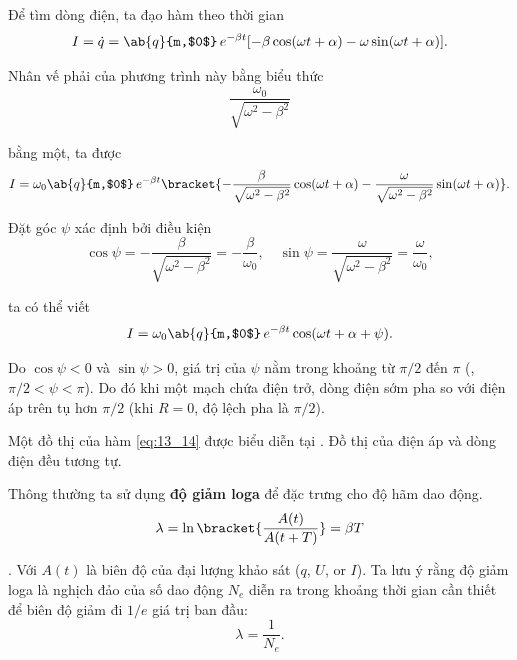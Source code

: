 Để tìm dòng điện, ta đạo hàm  theo thời gian
\begin{equation*}
    I = \dot{q} = \ab{q}{m,$0$}\, e^{-\beta t} [-\beta \cos(\omega t + \alpha) - \omega \sin(\omega t + \alpha)].
\end{equation*}

\noindent
Nhân vế phải của phương trình này bằng biểu thức
\begin{equation*}
    \frac{\omega_0}{\sqrt{\omega^2-\beta^2}}
\end{equation*}

\noindent
bằng một, ta được
\begin{equation*}
    I = \omega_0 \ab{q}{m,$0$}\, e^{-\beta t} \bracket{ - \frac{\beta}{\sqrt{\omega^2-\beta^2}} \cos(\omega t + \alpha) - \frac{\omega}{\sqrt{\omega^2-\beta^2}} \sin(\omega t + \alpha) }.
\end{equation*}

Đặt góc $\psi$ xác định bởi điều kiện
\begin{equation*}
    \cos\psi = - \frac{\beta}{\sqrt{\omega^2-\beta^2}} = - \frac{\beta}{\omega_0},\quad \sin\psi = \frac{\omega}{\sqrt{\omega^2-\beta^2}} = \frac{\omega}{\omega_0},
\end{equation*}

\noindent
ta có thể viết
\begin{equation}\label{eq:13_17}
    I = \omega_0 \ab{q}{m,$0$}\, e^{-\beta t} \cos(\omega t + \alpha + \psi).
\end{equation}

\noindent
Do $\cos\psi<0$ và $\sin\psi>0$, giá trị của $\psi$ nằm trong khoảng từ $\pi/2$ đến $\pi$ (\ie, $\pi/2<\psi<\pi$).
Do đó khi một mạch chứa điện trở, dòng điện sớm pha so với điện áp trên tụ hơn $\pi/2$ (khi $R=0$, độ lệch pha là $\pi/2$).

Một đồ thị của hàm \eqref{eq:13_14} được biểu diễn tại .
Đồ thị của điện áp và dòng điện đều tương tự.

Thông thường ta sử dụng \textbf{độ giảm loga} để đặc trưng cho độ hãm dao động.
\begin{equation}\label{eq:13_18}
    \lambda = \ln\bracket{ \frac{A(t)}{A(t+T)} } = \beta T
\end{equation}

.
Với $A(t)$ là biên độ của đại lượng khảo sát ($q$, $U$, or $I$).
Ta lưu ý rằng độ giảm loga là nghịch đảo của số dao động $N_e$ diễn ra trong khoảng thời gian cần thiết để biên độ giảm đi $1/e$ giá trị ban đầu:
\begin{equation*}
    \lambda = \frac{1}{N_e}.
\end{equation*}

